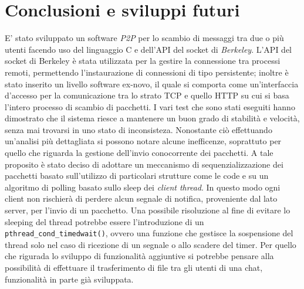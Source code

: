 \chapter{Conclusioni e sviluppi futuri}\label{conclusioni}
E' stato sviluppato un software \textit{P2P} per lo scambio di messaggi tra due o più utenti facendo uso del linguaggio C e dell'API del socket di \textit{Berkeley}. L'API del socket di Berkeley è stata utilizzata per la gestire la connessione tra processi remoti, permettendo l'instaurazione di connessioni di tipo persistente; inoltre è stato inserito un livello software ex-novo, il quale si comporta come un'interfaccia d'accesso per la comunicazione tra lo strato TCP e quello HTTP su cui si basa l'intero processo di scambio di pacchetti.
I vari test che sono stati eseguiti hanno dimostrato che il sistema riesce a mantenere un buon grado di stabilità e velocità, senza mai trovarsi in uno stato di inconsisteza. Nonostante ciò effettuando un'analisi più dettagliata si possono notare alcune inefficenze, soprattuto per quello che riguarda la gestione dell'invio conocorrente dei pacchetti. A tale proposito è stato deciso di adottare un meccanismo di sequenzializzazione dei pacchetti basato sull'utilizzo di particolari strutture come le code e su un algoritmo di polling basato sullo sleep dei \textit{client thread}.
In questo modo ogni client non rischierà di perdere alcun segnale di notifica, proveniente dal lato server, per l'invio di un pacchetto. Una possibile risoluzione al fine di evitare lo sleeping del thread potrebbe essere l'introduzione di un \texttt{pthread\_cond\_timedwait()}, ovvero una funzione che gestisce la sospensione del thread solo nel caso di ricezione di un segnale o allo scadere del timer. Per quello che rigurada lo sviluppo di funzionalità aggiuntive si potrebbe pensare alla possibilità di effettuare il trasferimento di file tra gli utenti di una chat, funzionalità in parte già sviluppata.